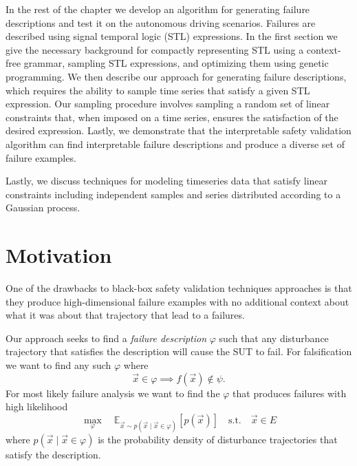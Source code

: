 In the rest of the chapter we develop an algorithm for generating failure descriptions and test it on the autonomous driving scenarios. Failures are described using signal temporal logic (STL) expressions. In the first section we give the necessary background for compactly representing STL using a context-free grammar, sampling STL expressions, and optimizing them using genetic programming. We then describe our approach for generating failure descriptions, which requires the ability to sample time series that satisfy a given STL expression. Our sampling procedure involves sampling a random set of linear constraints that, when imposed on a time series, ensures the satisfaction of the desired expression. Lastly, we demonstrate that the interpretable safety validation algorithm can find interpretable failure descriptions and produce a diverse set of failure examples. 

Lastly, we discuss techniques for modeling timeseries data that satisfy linear constraints including independent samples and series distributed according to a Gaussian process. 

\section{Motivation}

One of the drawbacks to black-box safety validation techniques approaches is that they produce high-dimensional failure examples with no additional context about what it was about that trajectory that lead to a failures. 

Our approach seeks to find a \emph{failure description} $\varphi$ such that any disturbance trajectory that satisfies the description will cause the SUT to fail. For falsification we want to find any such $\varphi$ where
\begin{equation}
    \vec{x} \in \varphi \implies f(\vec{x}) \not \in \psi \text{.}
\end{equation}
For most likely failure analysis we want to find the $\varphi$ that produces failures with high likelihood
\begin{equation}
\max_\varphi \quad \mathbb{E}_{\vec{x} \sim p(\vec{x} \mid \vec{x} \in \varphi)}[p(\vec{x})] \quad\textrm{s.t.}\quad \vec{x} \in E
\end{equation}
where $p(\vec{x} \mid \vec{x} \in \varphi)$ is the probability density of disturbance trajectories that satisfy the description. 


